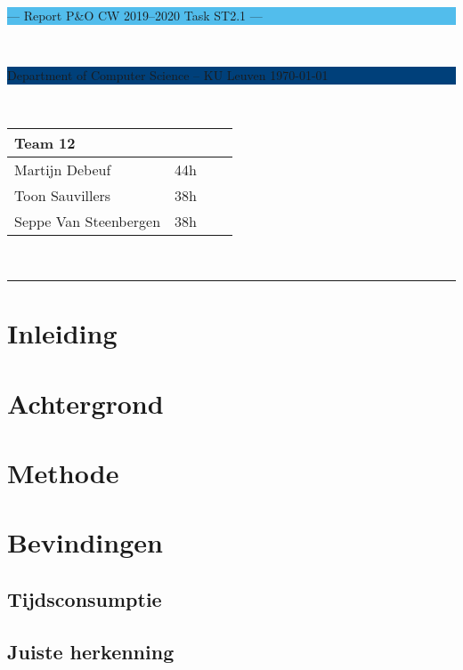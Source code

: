 \documentclass[a4paper,11pt]{article}
\begin{document}
\noindent
\colorbox[HTML]{52BDEC}{\bfseries\parbox{\textwidth}{\centering\large
  --- Report P\&O CW 2019--2020 Task ST2.1 ---
}}
\\[-1mm]
\colorbox[HTML]{00407A}{\bfseries\color{white}\parbox{\textwidth}{
  Department of Computer Science -- KU Leuven
  \hfill
  \today
}}
\\

\smallskip

\noindent
\begin{tabular}{*4l}
\toprule
\multicolumn{2}{l}{\large\textbf{Team 12}} \\
\midrule
Martijn Debeuf &  44h\\ %
Toon Sauvillers &  38h\\
Seppe Van Steenbergen & 38h\\
\bottomrule
\hline
\end{tabular}\\

\noindent
{\color[HTML]{52BDEC} \rule{\linewidth}{1mm} }

\tableofcontents
\newpage
\section{Inleiding}\label{sec:inleiding}
	

\section{Achtergrond}\label{sec:achtergrond}

\section{Methode}\label{sec:methode}
	

\section{Bevindingen}\label{sec:bevindingen}
	

	\subsection{Tijdsconsumptie}\label{subsec:tijd}
		
	\subsection{Juiste herkenning}\label{subsec:juisteherkenning}
		
\end{document}
